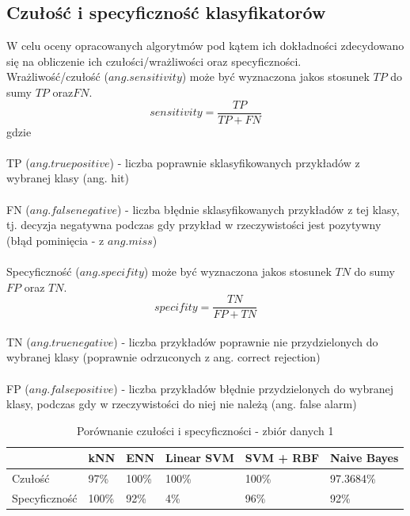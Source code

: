 \documentclass[[10pt,a4paper]{article}
\begin{document}
\subsection{Czułość i specyficzność klasyfikatorów}


W celu oceny opracowanych algorytmów pod kątem ich dokładności zdecydowano się na obliczenie ich czułości/wrażliwości oraz specyficzności.\\

Wrażliwość/czułość ($ang. sensitivity$) może być wyznaczona jakos stosunek $TP$ do sumy $TP$ oraz$ FN$.
 $$
sensitivity = \frac{TP}{TP + FN}
$$
gdzie\\
\\
TP ($ang. true positive$) - liczba poprawnie sklasyfikowanych przykładów z wybranej klasy (ang. hit)\\
\\
FN ($ang. false negative$) - liczba błędnie sklasyfikowanych przykładów z tej klasy, tj. decyzja negatywna podczas gdy przykład w rzeczywistości jest pozytywny (błąd pominięcia - z $ang. miss$)\\
\\
Specyficzność ($ang. specifity$) może być wyznaczona jakos stosunek $TN$ do sumy $FP$ oraz $TN$.\\
 $$
specifity = \frac{TN}{FP + TN}
$$
\\
TN ($ang. true negative$) - liczba przykładów poprawnie nie przydzielonych do wybranej klasy (poprawnie odrzuconych z ang. correct rejection)\\
\\
FP ($ang. false positive$) - liczba przykładów błędnie przydzielonych do wybranej klasy, podczas gdy w rzeczywistości do niej nie należą (ang. false alarm)\\

\begin{table}[h]
\centering
\caption{Porównanie czułości i specyficzności - zbiór danych 1}
\label{sens1}
\begin{tabular}{|l|l|l|l|l|l|}
\hline
              & kNN & ENN & Linear SVM & SVM + RBF & Naive Bayes \\ \hline
Czułość       &  97\%  & 100\%  &    100\%    &    100\%   &      97.3684\%      \\ \hline
Specyficzność &   100\%   &  92\%   &     4\%       &     96\%   &       92\%      \\ \hline
\end{tabular}
\end{table}
\end{document}
